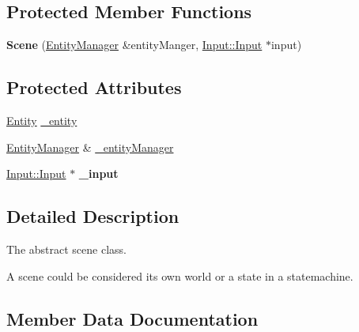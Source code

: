 \subsection*{Protected Member Functions}
\begin{DoxyCompactItemize}
\item 
{\bfseries Scene} (\hyperlink{class_ensum_1_1_components_1_1_entity_manager}{Entity\+Manager} \&entity\+Manger, \hyperlink{class_ensum_1_1_input_1_1_input}{Input\+::\+Input} $\ast$input)\hypertarget{class_ensum_1_1_components_1_1_scene_aee190492d4435b67533941958ff81a8e}{}\label{class_ensum_1_1_components_1_1_scene_aee190492d4435b67533941958ff81a8e}

\end{DoxyCompactItemize}
\subsection*{Protected Attributes}
\begin{DoxyCompactItemize}
\item 
\hyperlink{struct_ensum_1_1_components_1_1_entity}{Entity} \hyperlink{class_ensum_1_1_components_1_1_scene_a8d36e81874a5b07e3edbd8720b8b289e}{\+\_\+entity}
\item 
\hyperlink{class_ensum_1_1_components_1_1_entity_manager}{Entity\+Manager} \& \hyperlink{class_ensum_1_1_components_1_1_scene_af7eb8e3279c5b6768f442ae05b44e75f}{\+\_\+entity\+Manager}
\item 
\hyperlink{class_ensum_1_1_input_1_1_input}{Input\+::\+Input} $\ast$ {\bfseries \+\_\+input}\hypertarget{class_ensum_1_1_components_1_1_scene_ab7ee39773379321c85d73984b03c5568}{}\label{class_ensum_1_1_components_1_1_scene_ab7ee39773379321c85d73984b03c5568}

\end{DoxyCompactItemize}


\subsection{Detailed Description}
The abstract scene class. 

A scene could be considered it\textquotesingle{}s own world or a state in a statemachine. 

\subsection{Member Data Documentation}
